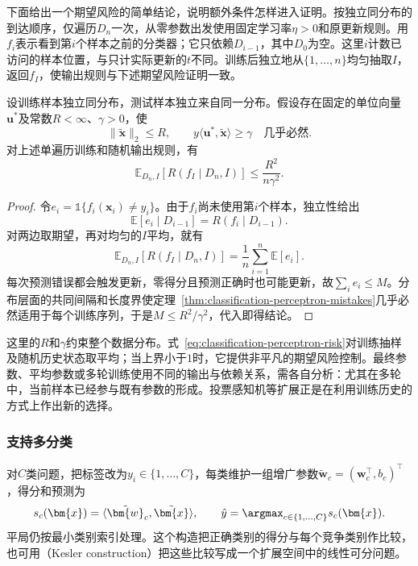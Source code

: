 下面给出一个期望风险的简单结论，说明额外条件怎样进入证明。按独立同分布的到达顺序，仅遍历$D_n$一次，从零参数出发使用固定学习率$\eta>0$和原更新规则。用$f_i$表示看到第$i$个样本之前的分类器；它只依赖$D_{i-1}$，其中$D_0$为空。这里$i$计数已访问的样本位置，与只计实际更新的$t$不同。训练后独立地从$\{1,\ldots,n\}$均匀抽取$I$，返回$f_I$，使输出规则与下述期望风险证明一致。

\begin{theorem}[随机历史分类器的期望风险]
  \label{thm:classification-perceptron-risk}
  设训练样本独立同分布，测试样本独立来自同一分布。假设存在固定的单位向量$\bm{u}^\ast$及常数$R<\infty$、$\gamma>0$，使
  \[
    \|\tilde{\bm{x}}\|_2\leq R,\qquad
    y\langle\bm{u}^\ast,\tilde{\bm{x}}\rangle\geq\gamma
    \quad\text{几乎必然}.
  \]
  对上述单遍历训练和随机输出规则，有
  \begin{equation}
    \label{eq:classification-perceptron-risk}
    \mathbb{E}_{D_n,I}\!\left[R(f_I\mid D_n,I)\right]
      \leq\frac{R^2}{n\gamma^2}.
  \end{equation}
\end{theorem}

\begin{proof}
  令$e_i=\mathbb{1}\{f_i(\bm{x}_i)\ne y_i\}$。由于$f_i$尚未使用第$i$个样本，独立性给出
  \[
    \mathbb{E}[e_i\mid D_{i-1}]
      =R(f_i\mid D_{i-1}).
  \]
  对两边取期望，再对均匀的$I$平均，就有
  \[
    \mathbb{E}_{D_n,I}[R(f_I\mid D_n,I)]
      =\frac1n\sum_{i=1}^{n}\mathbb{E}[e_i].
  \]
  每次预测错误都会触发更新，零得分且预测正确时也可能更新，故$\sum_i e_i\leq M$。分布层面的共同间隔和长度界使定理~\ref{thm:classification-perceptron-mistakes}几乎必然适用于每个训练序列，于是$M\leq R^2/\gamma^2$，代入即得结论。
\end{proof}

这里的$R$和$\gamma$约束整个数据分布。式~\eqref{eq:classification-perceptron-risk}对训练抽样及随机历史状态取平均；当上界小于$1$时，它提供非平凡的期望风险控制。最终参数、平均参数或多轮训练使用不同的输出与依赖关系，需各自分析：尤其在多轮中，当前样本已经参与既有参数的形成。投票感知机等扩展正是在利用训练历史的方式上作出新的选择。

\subsubsection{支持多分类}
\label{sec:classification-perceptron-multiclass}

对$C$类问题，把标签改为$y_i\in\{1,\ldots,C\}$，每类维护一组增广参数$\tilde{\bm{w}}_c=(\bm{w}_c^{\top},b_c)^{\top}$，得分和预测为
\[
  s_c(\bm{x})=\langle\tilde{\bm{w}}_c,\tilde{\bm{x}}\rangle,
  \qquad
  \hat y=\argmax_{c\in\{1,\ldots,C\}}s_c(\bm{x}).
\]
平局仍按最小类别索引处理。这个构造把正确类别的得分与每个竞争类别作比较，也可用（Kesler construction）把这些比较写成一个扩展空间中的线性可分问题。

